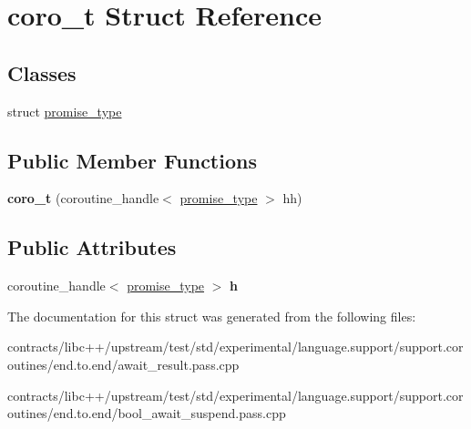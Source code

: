 \hypertarget{structcoro__t}{}\section{coro\+\_\+t Struct Reference}
\label{structcoro__t}
\subsection*{Classes}
\begin{DoxyCompactItemize}
\item 
struct \mbox{\hyperlink{structcoro__t_1_1promise__type}{promise\+\_\+type}}
\end{DoxyCompactItemize}
\subsection*{Public Member Functions}
\begin{DoxyCompactItemize}
\item 
\mbox{\label{structcoro__t_ae6a47b7b879565ce65f2431832349784}} 
{\bfseries coro\+\_\+t} (coroutine\+\_\+handle$<$ \mbox{\hyperlink{structcoro__t_1_1promise__type}{promise\+\_\+type}} $>$ hh)
\end{DoxyCompactItemize}
\subsection*{Public Attributes}
\begin{DoxyCompactItemize}
\item 
\mbox{\label{structcoro__t_ac5e0fe790f34e85f7338749d81e3a101}} 
coroutine\+\_\+handle$<$ \mbox{\hyperlink{structcoro__t_1_1promise__type}{promise\+\_\+type}} $>$ {\bfseries h}
\end{DoxyCompactItemize}


The documentation for this struct was generated from the following files\+:\begin{DoxyCompactItemize}
\item 
contracts/libc++/upstream/test/std/experimental/language.\+support/support.\+coroutines/end.\+to.\+end/await\+\_\+result.\+pass.\+cpp\item 
contracts/libc++/upstream/test/std/experimental/language.\+support/support.\+coroutines/end.\+to.\+end/bool\+\_\+await\+\_\+suspend.\+pass.\+cpp\end{DoxyCompactItemize}
